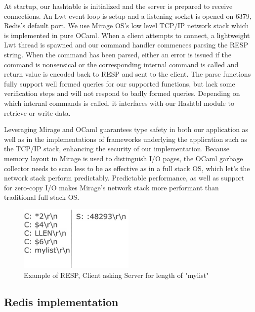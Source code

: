 \documentclass[english,10pt,twocolumn]{article}
\begin{document}
At startup, our hashtable is initialized and the server is prepared to receive connections. An Lwt event loop is setup and a listening socket is opened on 6379, Redis's default port.
We use Mirage OS's low level TCP/IP network stack which is implemented in pure OCaml.
When a client attempts to connect, a lightweight Lwt thread is spawned and our command handler commences parsing the RESP string.
When the command has been parsed, either an error is issued if the command is nonsensical or the corresponding internal command is called and return value is encoded back to RESP and sent to the client.
The parse functions fully support well formed queries for our supported functions, but lack some verification steps and will not respond to badly formed queries.
Depending on which internal commands is called, it interfaces with our Hashtbl module to retrieve or write data.

Leveraging Mirage and OCaml guarantees type safety in both our application as well as in the implementations of frameworks underlying the application such as the TCP/IP stack, enhancing the security of our implementation.
Because memory layout in Mirage is used to distinguish I/O pages, the OCaml garbage collector needs to scan less to be as effective as in a full stack OS, which let's the network stack perform predictably.
Predictable performance, as well as support for zero-copy I/O makes Mirage's network stack more performant than traditional full stack OS.

\begin{figure}[ht]
  \centering
  \caption{Example of RESP, Client asking Server for length of "mylist"}
  \includegraphics[width=0.5\textwidth]{images/resp}
\end{figure}


\subsection{Redis implementation}
\end{document}
